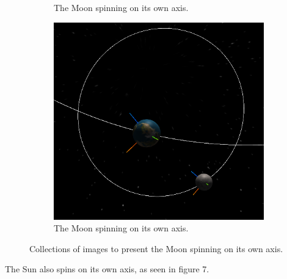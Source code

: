 \documentclass[12pt]{article}
\begin{document}
\begin{figure}[H]
\begin{subfigure}[b]{0.4\textwidth}
                \caption{The Moon spinning on its own axis.}
                \label{fig: The axial spin of the Moon.}
       \end{subfigure}
               \begin{subfigure}[b]{0.4\textwidth}
                \includegraphics[width=\textwidth]{images/earthandmoonaxisspinabove4}
                \caption{The Moon spinning on its own axis.}
                \label{fig: The axial spin of the Moon.}
       \end{subfigure}
       \caption{Collections of images to present the Moon spinning on its own axis.}\label{fig: The Moon's axial rotation.}
\end{figure}

The Sun also spins on its own axis, as seen in figure 7.
\end{document}
